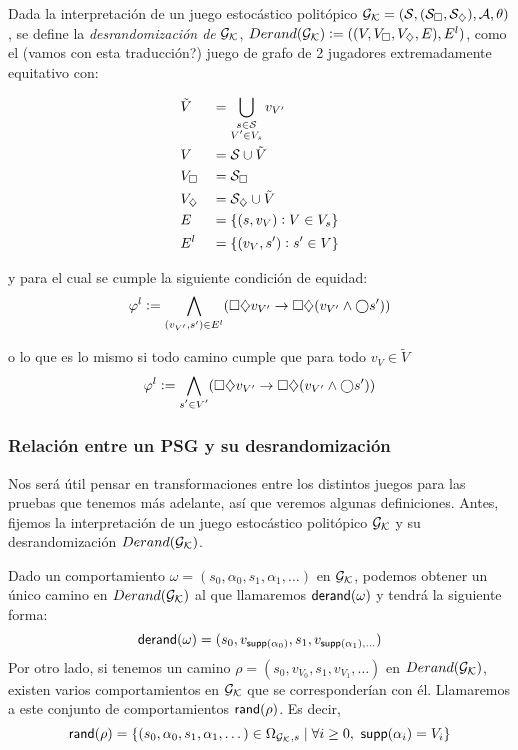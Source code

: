 Dada la interpretación de un juego estocástico politópico $\mathcal{G}_{\mathcal{K}} = (\mathcal{S},
	(\mathcal{S}_\square, \mathcal{S}_\diamondsuit), \mathcal{A}, \theta)$, se define la \textit{desrandomización
	de} $\mathcal{G}_{\mathcal{K}}$, $Derand(\mathcal{G}_{\mathcal{K}}) := (( V, V_\square, V_\diamondsuit, E ), E^l )$, como el (vamos con
esta traducción?) juego de grafo de 2 jugadores extremadamente equitativo con:

\begin{alignat*}{2}
	&\tilde V &&= \bigcup_{\substack{s \in \mathcal{S} \\ V' \in V_s}} v_{V'} \\
	&V &&= \mathcal{S} \cup \tilde V \\
	&V_\square &&= \mathcal{S}_\square \\
	&V_\diamondsuit &&= \mathcal{S}_\diamondsuit \cup \tilde V \\
	&E &&= \{(s, v_{V}) : V \in V_s\} \\
	&E^l &&= \{(v_{V}, s') : s' \in V\}
\end{alignat*}

y para el cual se cumple la siguiente condición de equidad: $$ \varphi^l :=
	\bigwedge_{(v_{V'},s') \in E^l} (\square \diamondsuit v_{V'} \rightarrow \square \diamondsuit
	(v_{V'} \wedge \bigcirc s' )) $$

o lo que es lo mismo si todo camino cumple que para todo $v_V \in \tilde V$ $$
	\varphi^l := \bigwedge_{\substack{s' \in V'}} (\square \diamondsuit v_{V'} \rightarrow
	\square \diamondsuit (v_{V'} \wedge \bigcirc s' )) $$

\subsubsection*{Relación entre un PSG y su desrandomización}

Nos será útil pensar en transformaciones entre los distintos juegos para las
pruebas que tenemos más adelante, así que veremos algunas definiciones. Antes,
fijemos la interpretación de un juego estocástico politópico $\mathcal{G}_{\mathcal{K}}$ y su
desrandomización $Derand(\mathcal{G}_{\mathcal{K}})$.

\begin{definition}
	Dado un comportamiento $\omega = (s_0, \alpha_0, s_1, \alpha_1, \dots)$ en $\mathcal{G}_{\mathcal{K}}$, podemos obtener un único camino en $Derand(\mathcal{G}_{\mathcal{K}})$ al que llamaremos $\textsf{derand}(\omega)$ y tendrá la siguiente forma:
	$$\textsf{derand}(\omega) = (s_0, v_{\textsf{supp}(\alpha_0)}, s_1, v_{\textsf{supp}(\alpha_1), \dots})$$
	Por otro lado, si tenemos un camino $\rho = (s_0, v_{V_0}, s_1, v_{V_1}, \dots)$ en $Derand(\mathcal{G}_{\mathcal{K}})$, existen varios comportamientos en $\mathcal{G}_{\mathcal{K}}$ que se corresponderían con él. Llamaremos a este conjunto de comportamientos $\textsf{rand}(\rho)$. Es decir,
	$$\textsf{rand}(\rho) = \{(s_0, \alpha_0, s_1, \alpha_1, \dots) \in \Omega_{\mathcal{G}_{\mathcal{K}},s} \mid \forall i \geq 0, \ \textsf{supp}(\alpha_i) = V_i\}$$
\end{definition}

